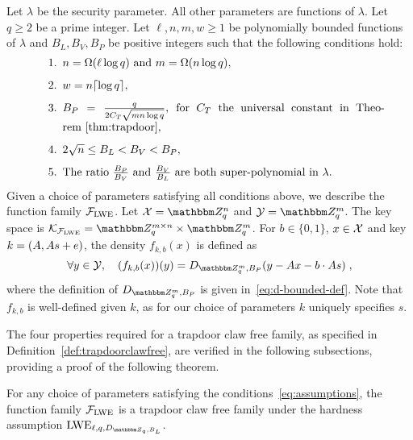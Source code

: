 
Let $\lambda$ be the security parameter. All other parameters are functions of $\lambda$. Let $q\geq 2$ be a prime integer. 
Let $\ell,n,m,w\geq 1$ be polynomially bounded functions of $\lambda$ and $B_L, B_V, B_P$ be positive integers such that the following conditions hold:
\begin{equation}\label{eq:assumptions}
    \begin{minipage}{0.9\textwidth}
\begin{enumerate}
\item  $n = \Omega(\ell \log q)$ and $m = \Omega(n\log q)$,
\item $w=n\lceil \log q\rceil$,
\item $B_P = \frac{q}{2C_T\sqrt{mn\log q}}$, for $C_T$ the universal constant in Theorem~\ref{thm:trapdoor},
\item $ 2\sqrt{n} \leq B_L < B_V < B_P$,
\item The ratio $\frac{B_P}{B_V}$ and $\frac{B_V}{B_L}$ are both super-polynomial  in $\lambda$.
\end{enumerate}
    \end{minipage}
  \end{equation}
Given a choice of parameters satisfying all conditions above, we describe the function family $\mathcal{F}_{\mathrm{LWE}}$. Let $\sX = \mZ_q^n$ and $\sY = \mZ_q^m$. 
The key space is $\mathcal{K}_{\mathcal{F}_{\lwe}} = \mZ_q^{m\times n} \times \mZ_q^m$. For $b\in \{0,1\}$, $x\in \mathcal{X}$ and key $k = (\*A,\*A\*s + \*e)$,  the density $f_{k,b}(x) $ is defined as
\begin{equation}\label{eq:defprobdensity}
  \forall y \in \sY,\quad   (f_{k,b}(x))(y) = D_{\mZ_q^m,B_P}(y - \*Ax - b\cdot \*A\*s)\;,
\end{equation}
where the definition of $D_{\mZ_q^m,B_P}$ is given in~\eqref{eq:d-bounded-def}. Note that $f_{k,b}$ is well-defined given $k$, as for our choice of parameters $k$ uniquely specifies $s$. 

 The four properties required for a trapdoor claw free family, as specified in Definition~\ref{def:trapdoorclawfree}, are verified in the following subsections, providing a proof of the following theorem.

\begin{theorem}\label{thm:lwetcf}
For any choice of parameters satisfying the conditions~\eqref{eq:assumptions}, the function family $\mathcal{F}_{\mathrm{LWE}}$ is a trapdoor claw free family under the hardness assumption $\lwe_{\ell,q,D_{\mZ_q,B_L}}$. 
\end{theorem}

